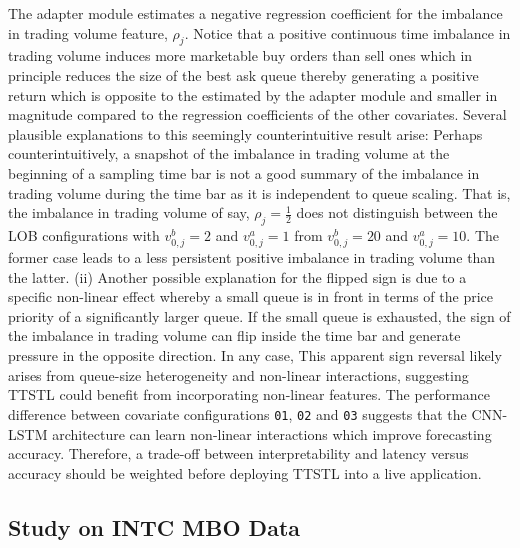 \documentclass[10pt,a4paper,oneside]{article}
\begin{document}
The adapter module estimates a negative regression coefficient for the imbalance in trading volume feature, $\rho_j$. Notice that a positive continuous time imbalance in trading volume induces more marketable buy orders than sell ones which in principle reduces the size of the best ask queue thereby generating a positive return which is opposite to the estimated by the adapter module and smaller in magnitude compared to the regression coefficients of the other covariates. Several plausible explanations to this seemingly counterintuitive result arise: Perhaps counterintuitively, a snapshot of the imbalance in trading volume at the beginning of a sampling time bar is not a good summary of the imbalance in trading volume during the time bar as it is independent to queue scaling. That is, the imbalance in trading volume of say, $\rho_j = \frac{1}{2}$ does not distinguish between the LOB configurations with $v^b_{0,j} = 2$ and $v^a_{0, j} = 1$ from $v^b_{0,j} = 20$ and $v^a_{0, j} = 10$. The former case leads to a less persistent positive imbalance in trading volume than the latter. (ii) Another possible explanation for the flipped sign is due to a specific non-linear effect whereby a small queue is in front in terms of the price priority of a significantly larger queue. If the small queue is exhausted, the sign of the imbalance in trading volume can flip inside the time bar and generate pressure in the opposite direction. In any case, This apparent sign reversal likely arises from queue-size heterogeneity and non-linear interactions, suggesting TTSTL could benefit from incorporating non-linear features. The performance difference between covariate configurations  \verb|01|, \verb|02| and \verb|03| suggests that the CNN-LSTM architecture can learn non-linear interactions which improve forecasting accuracy. Therefore, a trade-off between interpretability and latency versus accuracy should be weighted before deploying TTSTL into a live application.

\subsection{Study on INTC MBO Data}
\label{subsec:results_intc}
\end{document}
